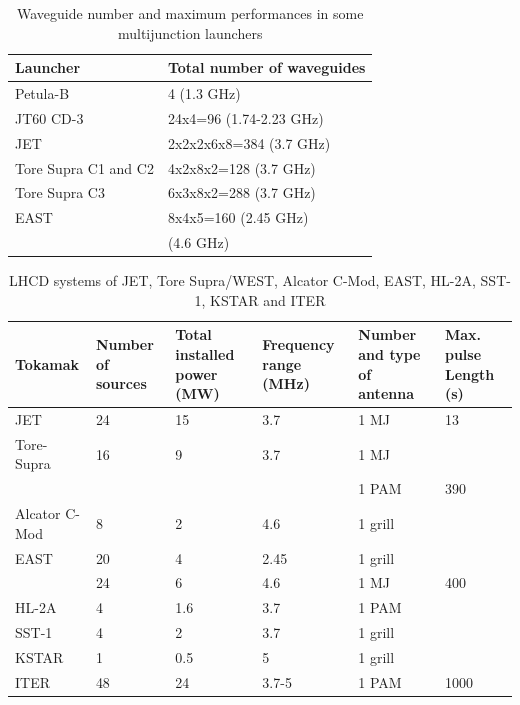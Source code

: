 \begin{table}
{
\begin{tabular}{| p{6cm} | p{5cm} |}
	\hline 
Launcher	& Total number of waveguides  \\ 
	\hline \hline
Petula-B \parencite{Gormezano1985}	& 4 (1.3 GHz)    \\ 
	\hline 
JT60 CD-3 \parencite{Ikeda1989}	& 24x4=96 (1.74-2.23 GHz)    \\ 
	\hline 
JET \parencite{Litaudon1990a}	& 2x2x2x6x8=384 (3.7 GHz)   \\ 
	\hline 
Tore Supra C1 and C2 \parencite{Litaudon1992a}	& 4x2x8x2=128 (3.7 GHz)   \\ 
	\hline 
Tore Supra C3 \parencite{Bibet2000}	& 6x3x8x2=288 (3.7 GHz)   \\ 
	\hline 
EAST & 8x4x5=160 (2.45 GHz) \\
	 & (4.6 GHz) \\
\hline
\end{tabular} 
}
\caption{Waveguide number and maximum performances in some multijunction launchers}
\label{tab:multijunctionperformances}
\end{table}

\begin{table}
		\begin{tabularx}{\textwidth}{|X|X|X|X|X|X|}
			\hline
Tokamak	& Number of sources & Total installed power (MW) &	Frequency range (MHz) &	Number and type of antenna & 	Max. pulse Length (s) \\
			\hline\hline
JET				& 24	& 15	& 3.7 	& 1 MJ	& 13  	\\
Tore-Supra 		& 16 	& 9		& 3.7	& 1 MJ 	& 		\\
				&    	&  		&      	& 1 PAM 			& 390 	\\
Alcator C-Mod	& 8		& 2		& 4.6	& 1 grill			& 		\\
EAST			& 20 	& 4 	& 2.45 	& 1 grill 			& 		\\
				& 24	& 6 	& 4.6	& 1 MJ	& 400 	\\
HL-2A 			& 4 	& 1.6	& 3.7	& 1 PAM 			& 		\\
SST-1 			& 4 	& 2		& 3.7 	& 1 grill			&	 	\\
KSTAR 			& 1 	& 0.5	& 5 	& 1 grill			& 		\\
ITER 			& 48	& 24 	& 3.7-5 & 1 PAM				& 1000 	\\
			\hline
\end{tabularx}
\caption{LHCD systems of JET, Tore Supra/WEST, Alcator C-Mod, EAST, HL-2A, SST-1, KSTAR and ITER}
\label{tab:recentLHCDsystems}
\end{table}

